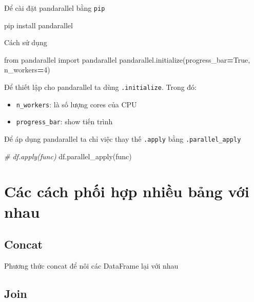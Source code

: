 \documentclass[
]{book}
\newenvironment{Shaded}{\begin{snugshade}}{\end{snugshade}}
\newcommand{\CommentTok}[1]{\textcolor[rgb]{0.56,0.35,0.01}{\textit{#1}}}
\newcommand{\DecValTok}[1]{\textcolor[rgb]{0.00,0.00,0.81}{#1}}
\newcommand{\ImportTok}[1]{#1}
\newcommand{\NormalTok}[1]{#1}
\newcommand{\OperatorTok}[1]{\textcolor[rgb]{0.81,0.36,0.00}{\textbf{#1}}}
\newcommand{\VariableTok}[1]{\textcolor[rgb]{0.00,0.00,0.00}{#1}}
\begin{document}
Để cài đặt pandarallel bằng \texttt{pip}

\begin{Shaded}
\begin{Highlighting}[]
\NormalTok{pip install pandarallel}
\end{Highlighting}
\end{Shaded}

Cách sử dụng

\begin{Shaded}
\begin{Highlighting}[]
\ImportTok{from}\NormalTok{ pandarallel }\ImportTok{import}\NormalTok{ pandarallel}
\NormalTok{pandarallel.initialize(progress\_bar}\OperatorTok{=}\VariableTok{True}\NormalTok{, n\_workers}\OperatorTok{=}\DecValTok{4}\NormalTok{)}
\end{Highlighting}
\end{Shaded}

Để thiết lập cho pandarallel ta dùng \texttt{.initialize}. Trong đó:

\begin{itemize}
\item
  \texttt{n\_workers}: là số lượng cores của CPU
\item
  \texttt{progress\_bar}: show tiến trình
\end{itemize}

Để áp dụng pandarallel ta chỉ việc thay thế \texttt{.apply} bằng \texttt{.parallel\_apply}

\begin{Shaded}
\begin{Highlighting}[]
\CommentTok{\# df.apply(func)}
\NormalTok{df.parallel\_apply(func)}
\end{Highlighting}
\end{Shaded}

\chapter{Các cách phối hợp nhiều bảng với nhau}\label{cuxe1c-cuxe1ch-phux1ed1i-hux1ee3p-nhiux1ec1u-bux1ea3ng-vux1edbi-nhau}

\section{Concat}\label{concat}

Phương thức concat để nôi các DataFrame lại với nhau

\section{Join}\label{join}
\end{document}
